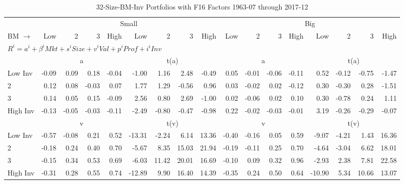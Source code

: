 
\begin{table}[!ht]
\footnotesize
\centering
\caption{32-Size-BM-Inv Portfolios with F16 Factors 1963-07 through 2017-12}
\begin{tabular}{lrrrrrrrrrrrrrrrr}
  \toprule
    & \multicolumn{8}{c}{Small} & \multicolumn{8}{c}{Big} \\
      \cmidrule(r){2-9} \cmidrule(r){10-17}
    BM $\rightarrow$ & Low & 2 & 3 & High & Low & 2 & 3 & High & Low & 2 & 3 & High & Low & 2 & 3 & High \\ 
  \midrule
  \multicolumn{17}{l}{$R^i=a^i+\beta^iMkt+s^iSize+v^iVal+p^iProf+i^iInv$} \\

  
    
      & \multicolumn{4}{c}{a} & \multicolumn{4}{c}{t(a)}
    
      & \multicolumn{4}{c}{a} & \multicolumn{4}{c}{t(a)}
    
    \\
      \cmidrule(r){2-5} \cmidrule(r){6-9} \cmidrule(r){10-13} \cmidrule(r){14-17}

    Low Inv   & -0.09  & 0.09  & 0.18  & -0.04  & -1.00  & 1.16  & 2.48  & -0.49  & 0.05  & -0.01  & -0.06  & -0.11  & 0.52  & -0.12  & -0.75  & -1.47  \\
           2  & 0.12  & 0.08  & -0.03  & 0.07  & 1.77  & 1.29  & -0.56  & 0.96  & 0.03  & -0.02  & 0.02  & -0.12  & 0.30  & -0.30  & 0.28  & -1.51  \\
           3  & 0.14  & 0.05  & 0.15  & -0.09  & 2.56  & 0.80  & 2.69  & -1.00  & 0.02  & -0.06  & 0.02  & 0.10  & 0.30  & -0.78  & 0.24  & 1.11  \\
    High Inv  & -0.13  & -0.05  & -0.03  & -0.11  & -2.49  & -0.80  & -0.47  & -0.98  & 0.22  & -0.02  & -0.03  & -0.01  & 3.19  & -0.26  & -0.29  & -0.07  \\

  
    
      & \multicolumn{4}{c}{v} & \multicolumn{4}{c}{t(v)}
    
      & \multicolumn{4}{c}{v} & \multicolumn{4}{c}{t(v)}
    
    \\
      \cmidrule(r){2-5} \cmidrule(r){6-9} \cmidrule(r){10-13} \cmidrule(r){14-17}

    Low Inv   & -0.57  & -0.08  & 0.21  & 0.52  & -13.31  & -2.24  & 6.14  & 13.36  & -0.40  & -0.16  & 0.05  & 0.59  & -9.07  & -4.21  & 1.43  & 16.36  \\
           2  & -0.18  & 0.24  & 0.40  & 0.70  & -5.67  & 8.35  & 15.03  & 21.94  & -0.19  & -0.11  & 0.25  & 0.70  & -4.64  & -3.04  & 6.62  & 18.01  \\
           3  & -0.15  & 0.34  & 0.53  & 0.69  & -6.03  & 11.42  & 20.01  & 16.69  & -0.10  & 0.09  & 0.32  & 0.96  & -2.93  & 2.38  & 7.81  & 22.58  \\
    High Inv  & -0.31  & 0.28  & 0.55  & 0.74  & -12.89  & 9.90  & 16.40  & 14.39  & -0.35  & 0.24  & 0.50  & 0.64  & -10.90  & 5.34  & 10.66  & 13.07  \\


\end{tabular}
\end{table}
